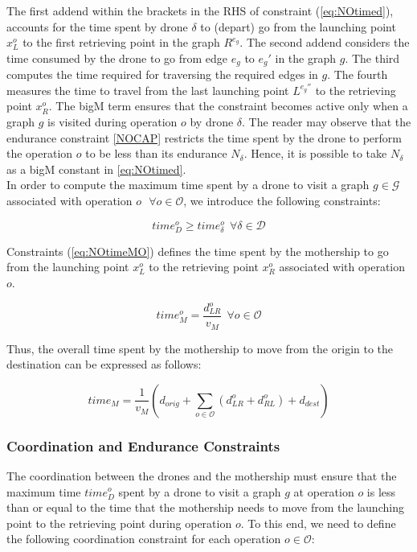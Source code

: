 \documentclass[10pt,a4paper]{elsarticle}
\begin{document}
			\noindent
			The first addend within the brackets in the RHS of constraint (\ref{eq:NOtimed}), accounts for the time spent by drone $\delta$ to (depart) go from the launching point $x_L^o$ to the first retrieving point in the graph $R^{e_g}$. The second addend considers the time consumed by the drone to go from edge $e_g$ to $e_g'$ in the graph $g$. The third computes the time required for traversing the required edges in $g$. The fourth measures the time to travel from the last launching point $L^{e_g''}$ to the retrieving point $x_R^o$.
			The bigM term ensures that the constraint becomes active only when a graph $g$ is visited during operation $o$ by drone $\delta$. The reader may observe that the endurance constraint \eqref{NOCAP} restricts the time spent by the drone to perform the operation $o$ to be less than its endurance $N_\delta$. Hence, it is possible to take $N_\delta$ as a bigM constant in \eqref{eq:NOtimed}.\\
			
			
			\noindent
			In order to compute the maximum time spent by a drone to visit a graph $g \in \mathcal G$ associated with operation $o \:\:\ \forall o \in \mathcal O$, we introduce the following constraints:
			
			\begin{equation}
				time_D^o \geq time_\delta^o \:\: \forall \delta \in \mathcal D
				\label{eq:NOtimeD}
			\end{equation}
			
			\noindent
			Constraints (\ref{eq:NOtimeMO}) defines the time spent by the mothership to go from the launching point $x_L^o$ to the retrieving point $x_R^o$ associated with operation $o$. 
			
			\begin{equation}
				time_M^o = \frac{d_{LR}^o}{v_M} \:\: \forall o \in \mathcal O
				\label{eq:NOtimeMO}
			\end{equation}
			
			\noindent
			Thus, the overall time spent by the mothership to move from the origin to the destination can be expressed as follows:
			
			\begin{equation}
				time_M = \frac{1}{v_M} (d_{orig} + \sum_{o \in \mathcal O} (d_{LR}^o + d_{RL}^o) + d_{dest})
				\label{eq:NOtimeM}
			\end{equation}
			
			
			\subsubsection*{Coordination and Endurance Constraints}
			\noindent
			The coordination between the drones and the mothership must ensure that the maximum time $time_D^o$ spent by a drone to visit a graph $g$ at operation $o$ is less than or equal to the time that the mothership needs to move from the launching point to the retrieving point during operation $o$. To this end, we need to define the following coordination constraint for each operation $o\in \mathcal O$:
			
\end{document}
